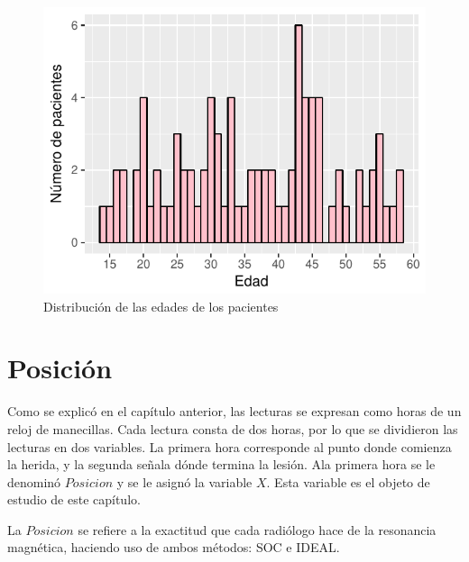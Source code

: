 \documentclass[11pt]{book}
\newcommand{\forceindent}{\leavevmode{\parindent=2em\indent}} %
\begin{document}
	
	
	
	
	
	
	\begin{figure}[H]
		\begin{center}
			\centering
			\includegraphics[scale=.8]{distribucion_edades}
			\caption{Distribución de las edades de los pacientes}
			\label{fig:edades}
		\end{center}
	\end{figure}
	
	
	
	\section{Posición}
	\forceindent Como se explicó en el capítulo anterior, las lecturas se expresan como horas de un reloj de manecillas. Cada lectura consta de dos horas, por lo que se dividieron las lecturas en dos variables. La primera hora corresponde al punto donde comienza la herida, y la segunda señala dónde termina la lesión. Ala primera hora se le denominó $Posicion$ y se le asignó la variable $X$. Esta variable es el objeto de estudio de este capítulo.
	
	\forceindent La $Posicion$ se refiere a la exactitud que cada radiólogo hace de la resonancia magnética, haciendo uso de ambos métodos: SOC e IDEAL.
	
	
	
\end{document}
